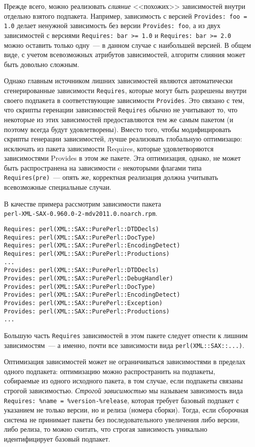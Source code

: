 \documentclass[russian,a4paper,12pt,titlepage]{article}
\begin{document}
Прежде всего, можно реализовать \textit{слияние} <<похожих>> зависимостей внутри отдельно взятого подпакета.
Например, зависимость с версией \verb|Provides: foo = 1.0| делает ненужной зависимость без версии \verb|Provides: foo|,
а из двух зависимостей с версиями \verb|Requires: bar >= 1.0| и \verb|Requires: bar >= 2.0| можно оставить только
одну~--- в данном случае с наибольшей версией.  В общем виде, с учетом всевозможных атрибутов зависимостей,
алгоритм слияния может быть довольно сложным.

Однако главным источником лишних зависимостей являются автоматически сгенерированные зависимости \verb|Requires|,
которые могут быть разрешены внутри своего подпакета в соответствующие зависимости \verb|Provides|.  Это
связано с тем, что скрипты геренации зависимостей \verb|Requires| обычно не учитывают то, что некоторые
из этих зависимостей предоставляются тем же самым пакетом (и поэтому всегда будут удовлетворены).
Вместо того, чтобы модифицировать скрипты генерации зависимостей, лучше реализовать глобальную оптимизацю:
исключать из пакета зависимости Requires, которые удовлетворяются зависимостями Provides в этом же пакете.
Эта оптимизация, однако, не может быть распространена на зависимости c некоторыми флагами типа \verb|Requires(pre)|~---
опять же, корректная реализация должна учитывать всевозможные специальные случаи.

В качестве примера рассмотрим зависимости пакета\\ \verb|perl-XML-SAX-0.960.0-2-mdv2011.0.noarch.rpm|.
\begin{verbatim}
Requires: perl(XML::SAX::PurePerl::DTDDecls)
Requires: perl(XML::SAX::PurePerl::DocType)
Requires: perl(XML::SAX::PurePerl::EncodingDetect)
Requires: perl(XML::SAX::PurePerl::Productions)
...
Provides: perl(XML::SAX::PurePerl::DTDDecls)
Provides: perl(XML::SAX::PurePerl::DebugHandler)
Provides: perl(XML::SAX::PurePerl::DocType)
Provides: perl(XML::SAX::PurePerl::EncodingDetect)
Provides: perl(XML::SAX::PurePerl::Exception)
Provides: perl(XML::SAX::PurePerl::Productions)
...
\end{verbatim}
Большую часть \verb|Requires| зависимостей в этом пакете следует отнести к лишним зависимостям~---
а именно, почти все зависимости вида \verb|perl(XML::SAX::...)|.

Оптимизация зависимостей может не ограничиваться зависимостями в пределах одного подпакета:
оптимизацию можно распространить на подпакеты, собираемые из одного исходного пакета, в том случае,
если подпакеты связаны строгой зависимостью.  \textit{Строгой зависимостью} мы называем зависимость
вида \verb|Requires: %name = %version-%release|, которая требует базовый подпакет с указанием не
только версии, но и релиза (номера сборки).  Тогда, если сборочная система не принимает пакеты
без последовательного увеличения либо версии, либо релиза, то можно считать, что строгая зависимость
уникально идентифицирует базовый подпакет.
\end{document}
